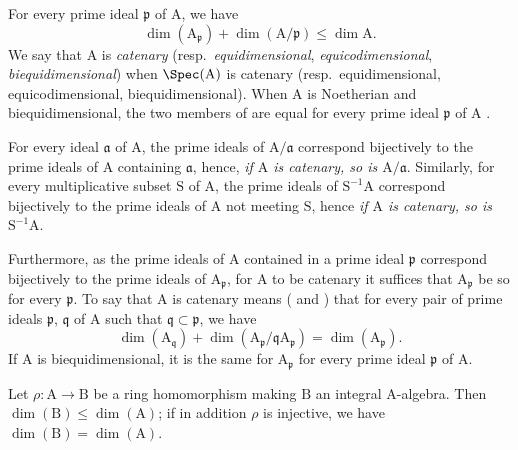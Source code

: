 \begin{env}[16.1.4]
\label{0.16.1.4}
For every prime ideal $\mathfrak{p}$ of $\mathrm{A}$, we have 
\begin{equation}
\label{0.16.1.4.1}
\tag{16.1.4.1}
  \dim(\mathrm{A}_\mathfrak{p})+\dim(\mathrm{A}/\mathfrak{p})\leq\dim\mathrm{A}.
\end{equation}
We say that $\mathrm{A}$ is \emph{catenary} (resp.~\emph{equidimensional}, \emph{equicodimensional}, \emph{biequidimensional}) when $\Spec(\mathrm{A})$ is catenary (resp.~equidimensional, equicodimensional, biequidimensional).
When $\mathrm{A}$ is Noetherian and biequidimensional, the two members of  are equal for every prime ideal $\mathfrak{p}$ of $\mathrm{A}$ .

For every ideal $\mathfrak{a}$ of $\mathrm{A}$, the prime ideals of $\mathrm{A}/\mathfrak{a}$ correspond bijectively to the prime ideals of $\mathrm{A}$ containing $\mathfrak{a}$, hence, \emph{if $\mathrm{A}$ is catenary, so is $\mathrm{A}/\mathfrak{a}$}.
Similarly, for every multiplicative subset $\mathrm{S}$ of $\mathrm{A}$, the prime ideals of $\mathrm{S}^{-1}\mathrm{A}$ correspond bijectively to the prime ideals of $\mathrm{A}$ not meeting $\mathrm{S}$, hence \emph{if $\mathrm{A}$ is catenary, so is $\mathrm{S}^{-1}\mathrm{A}$}.

Furthermore, as the prime ideals of $\mathrm{A}$ contained in a prime ideal $\mathfrak{p}$ correspond bijectively to the prime ideals of $\mathrm{A}_\mathfrak{p}$, for $\mathrm{A}$ to be catenary it suffices that $\mathrm{A}_\mathfrak{p}$ be so for every $\mathfrak{p}$.
To say that $\mathrm{A}$ is catenary means ( and ) that for every pair of prime ideals $\mathfrak{p}$, $\mathfrak{q}$ of $\mathrm{A}$ such that $\mathfrak{q}\subset\mathfrak{p}$, we have
\begin{equation}
\label{0.16.1.4.2}
\tag{16.1.4.2}
  \dim(\mathrm{A}_\mathfrak{q})+\dim(\mathrm{A}_\mathfrak{p}/\mathfrak{q}\mathrm{A}_\mathfrak{p})=\dim(\mathrm{A}_\mathfrak{p}).
\end{equation}
If $\mathrm{A}$ is biequidimensional, it is the same for $\mathrm{A}_\mathfrak{p}$ for every prime ideal $\mathfrak{p}$ of $\mathrm{A}$.
\end{env}

\begin{proposition}[16.1.5]
\label{0.16.1.5}
Let $\rho:\mathrm{A}\to\mathrm{B}$ be a ring homomorphism making $\mathrm{B}$ an integral $\mathrm{A}$-algebra.
Then $\dim(\mathrm{B})\leq\dim(\mathrm{A})$; if in addition $\rho$ is injective, we have $\dim(\mathrm{B})=\dim(\mathrm{A})$.
\end{proposition}

